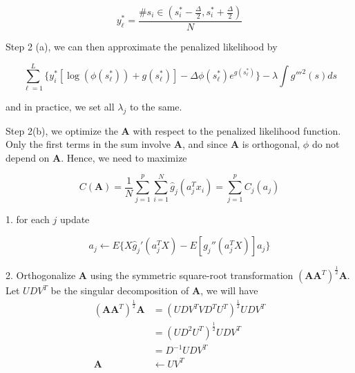 \documentclass{article}
\begin{document}
\begin{equation}
	y_\ell^* = \frac{\# s_i\in(s_i^* - \frac{\Delta}{2}, s_i^* + \frac{\Delta}{2} )}{N}
\end{equation}

Step 2 (a), we can then approximate the penalized likelihood by

\begin{equation}
	\sum_{\ell = 1}^L \Big\{ y_i^*[\log(\phi(s_\ell^*)) + g(s_\ell^*) ] - \Delta \phi(s_\ell^*)e^{g(s_\ell^*)} \Big\} - \lambda \int g'''^2(s)ds
\end{equation}

and in practice, we set all $\lambda_j$ to the same.

Step 2(b), we optimize the $\pmb A$ with respect to the penalized likelihood function. Only the first terms in the sum involve $\pmb A$, and since $\pmb A$ is orthogonal, $\phi$ do not depend on $\pmb A$. Hence, we need to maximize

\begin{equation}
	C(\pmb A) = \frac{1}{N}\sum_{j=1}^p \sum_{i=1}^N \hat g_j(a_j^Tx_i) = \sum_{j=1}^p C_j(a_j)
\end{equation}

1. for each $j$ update

\begin{equation}
	a_j \longleftarrow E\bigg\{ X\hat g_j'(a_j^TX) - E[g_j''(a_j^TX)]a_j \bigg\}
\end{equation}

2. Orthogonalize $\pmb A$ using the symmetric square-root transformation $(\pmb A\pmb A^T)^{\frac{1}{2}}\pmb A$. Let $UDV^T$ be the singular decomposition of $\pmb A$, we will have 
\begin{align}
	(\pmb A\pmb A^T)^{\frac{1}{2}}\pmb A &= (UDV^T VD^TU^T)^{\frac{1}{2}} UDV^T\\
	& = (UD^2U^T)^{\frac{1}{2}}UDV^T\\
	& = D^{-1}UDV^T\\
	 \pmb A &\leftarrow  UV^T
\end{align}
\end{document}
